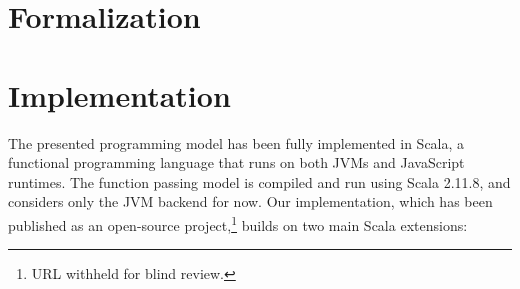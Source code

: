 \documentclass{jfp1}
\begin{document}



\section{Formalization}
\label{sec:formalization}


\section{Implementation}
\label{sec:implementation}

The presented programming model has been fully implemented in Scala, a
functional programming language that runs on both JVMs and JavaScript runtimes.
The function passing model is compiled and run using Scala 2.11.8, and considers
only the JVM backend for now. Our implementation, which has been published as an
open-source project,\footnote{URL withheld for blind review.} builds on two main
Scala extensions:
\end{document}
